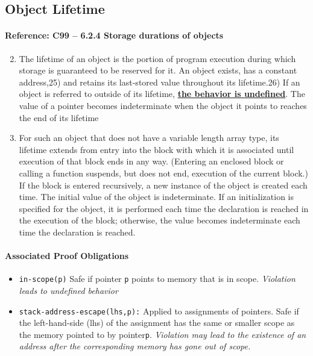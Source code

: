 \documentclass[11pt]{article}
\begin{document}
\subsection{Object Lifetime}
\label{app:lifetime}

\paragraph{Reference: C99 -- 6.2.4 Storage durations of objects}
\begin{enumerate}
\setcounter{enumi}{1}
\item 
The lifetime of an object is the portion of program execution during which storage is 
guaranteed to be reserved for it. An object exists, has a constant address,25) and 
retains its last-stored value throughout its lifetime.26) If an object is referred 
to outside of its lifetime, \underline{\bf the behavior is undefined}. The value of a pointer 
becomes indeterminate when the object it points to reaches the end of its lifetime
\setcounter{enumi}{3}
\item 
For such an object that does not have a variable length array type, its lifetime extends 
from entry into the block with which it is associated until execution of that block ends 
in any way. (Entering an enclosed block or calling a function suspends, but does not end,
execution of the current block.) If the block is entered recursively, a new instance of 
the object is created each time. The initial value of the object is indeterminate. If 
an initialization is specified for the object, it is performed each time the declaration 
is reached in the execution of the block; otherwise, the value becomes indeterminate 
each time the declaration is reached.
\end{enumerate} 

\paragraph{Associated Proof Obligations} 
\begin{itemize}
\item {\tt in-scope(p)} Safe if pointer {\tt p} points to memory that is in  scope.
\emph{Violation leads to undefined behavior}
\item {\tt stack-address-escape(lhs,p):} Applied to assignments of pointers.
Safe if the left-hand-side (lhs) of
the assignment has the same or smaller scope as the memory pointed to by pointer{\tt p}.
\emph{Violation may lead to the existence of an address after the corresponding memory
has gone out of scope.}
\end{itemize}
\end{document}

